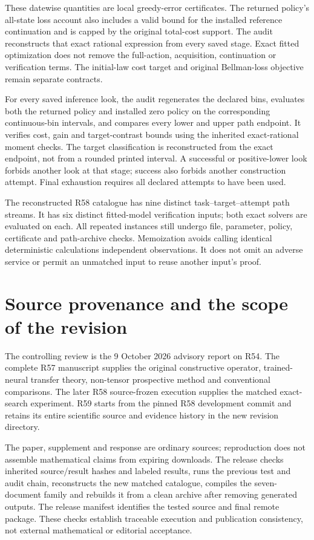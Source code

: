 These datewise quantities are local greedy-error certificates. The returned policy's all-state loss account also includes a valid bound for the installed reference continuation and is capped by the original total-cost support. The audit reconstructs that exact rational expression from every saved stage. Exact fitted optimization does not remove the full-action, acquisition, continuation or verification terms. The initial-law cost target and original Bellman-loss objective remain separate contracts.

For every saved inference look, the audit regenerates the declared bins, evaluates both the returned policy and installed zero policy on the corresponding continuous-bin intervals, and compares every lower and upper path endpoint. It verifies cost, gain and target-contrast bounds using the inherited exact-rational moment checks. The target classification is reconstructed from the exact endpoint, not from a rounded printed interval. A successful or positive-lower look forbids another look at that stage; success also forbids another construction attempt. Final exhaustion requires all declared attempts to have been used.

The reconstructed R58 catalogue has nine distinct task--target--attempt path streams. It has six distinct fitted-model verification inputs; both exact solvers are evaluated on each. All repeated instances still undergo file, parameter, policy, certificate and path-archive checks. Memoization avoids calling identical deterministic calculations independent observations. It does not omit an adverse service or permit an unmatched input to reuse another input's proof.

\section{Source provenance and the scope of the revision}\label{supp:provenance59}
The controlling review is the 9 October 2026 advisory report on R54. The complete R57 manuscript supplies the original constructive operator, trained-neural transfer theory, non-tensor prospective method and conventional comparisons. The later R58 source-frozen execution supplies the matched exact-search experiment. R59 starts from the pinned R58 development commit and retains its entire scientific source and evidence history in the new revision directory.

The paper, supplement and response are ordinary sources; reproduction does not assemble mathematical claims from expiring downloads. The release checks inherited source/result hashes and labeled results, runs the previous test and audit chain, reconstructs the new matched catalogue, compiles the seven-document family and rebuilds it from a clean archive after removing generated outputs. The release manifest identifies the tested source and final remote package. These checks establish traceable execution and publication consistency, not external mathematical or editorial acceptance.

